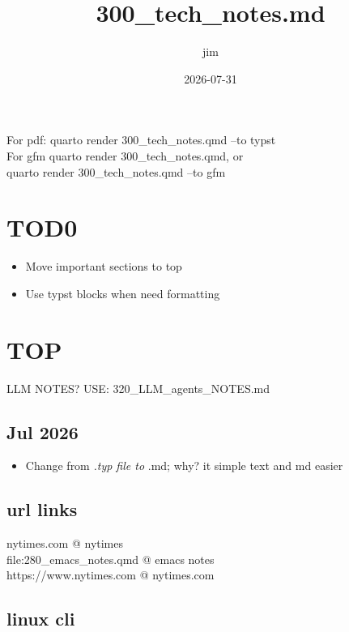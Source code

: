 \documentclass[
]{report}
\title{300\_tech\_notes.md}
\author{jim}
\date{2026-07-31}
\providecommand{\tightlist}{%
  \setlength{\itemsep}{0pt}\setlength{\parskip}{0pt}}\usepackage{longtable,booktabs,array}
\begin{document}
\maketitle


For pdf: quarto render 300\_tech\_notes.qmd --to typst\\

For gfm quarto render 300\_tech\_notes.qmd, or\\
quarto render 300\_tech\_notes.qmd --to gfm\\

\section{TOD0}\label{tod0}

\begin{itemize}
\tightlist
\item
  Move important sections to top
\item
  Use typst blocks when need formatting
\end{itemize}

\section{TOP}\label{top}

LLM NOTES? USE: 320\_LLM\_agents\_NOTES.md

\subsection{Jul 2026}\label{jul-2026}

\begin{itemize}
\tightlist
\item
  Change from \emph{.typ file to }.md; why? it simple text and md easier
\end{itemize}

\subsection{url links}\label{url-links}

nytimes.com @ nytimes\\
file:280\_emacs\_notes.qmd @ emacs notes\\
https://www.nytimes.com @ nytimes.com\\

\subsection{linux cli}\label{linux-cli}
\end{document}
